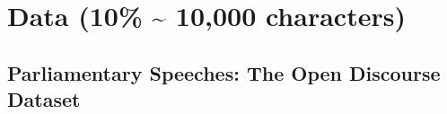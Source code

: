 \documentclass[12pt]{scrartcl}
\numberwithin{equation}{section}				%
\begin{document}
    
    
    \section{Data (10\% \; \textasciitilde{} 10,000 characters)}
    
    \subsection{Parliamentary Speeches: The Open Discourse Dataset}
    
\end{document}
